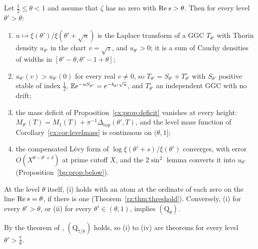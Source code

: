 \begin{corollary}\label{qrh:cor:thorin}
Let $\frac12\le\theta<1$ and assume that $\zeta$ has no zero with $\operatorname{Re} s>\theta$. Then for every level $\theta'>\theta$:
\begin{enumerate}
\item[(i)] $u\mapsto\xi(\theta')/\xi(\theta'+\sqrt u)$ is the Laplace transform of a GGC $T_{\theta'}$ with Thorin density $u_{\theta'}$ in the chart $v=\sqrt z$, and $u_{\theta'}>0$; it is a sum of Cauchy densities of widths in $[\theta'-\theta,\theta'-1+\theta]$;
\item[(ii)] $u_{\theta'}(v)>u_{\theta'}(0)$ for every real $v\ne0$, so $T_{\theta'}=S_{\theta'}+T^\circ_{\theta'}$ with $S_{\theta'}$ positive stable of index $\frac12$, $\mathbb{E} e^{-uS_{\theta'}}=e^{-b_{\theta'}\sqrt u}$, and $T^\circ_{\theta'}$ an independent GGC with no drift;
\item[(iii)] the mass deficit of Proposition~\ref{cx:prop:deficit} vanishes at every height: $M_{\theta'}(T)=M_1(T)+\pi^{-1}\Delta_{\mathrm{top}}(\theta',T)$, and the level mass function of Corollary~\ref{cx:cor:levelmass} is continuous on $(\theta,1]$;
\item[(iv)] the compensated L\'evy form of $\log\xi(\theta'+s)/\xi(\theta')$ converges, with error $O(X^{\theta-\theta'+\delta})$ at prime cutoff $X$, and the $2\sin^2$ lemma converts it into $u_{\theta'}$ (Proposition~\ref{bp:prop:below}).
\end{enumerate}
At the level $\theta$ itself, (i) holds with an atom at the ordinate of each zero on the line $\operatorname{Re} s=\theta$, if there is one (Theorem~\ref{rz:thm:threshold}). Conversely, (i) for every $\theta'>\theta$, or (ii) for every $\theta'\in(\theta,1)$, implies $(\mathrm Q_\theta)$.
\end{corollary}

By the theorem of \cite{OAI26a}, $(\mathrm Q_{7/8})$ holds, so (i) to (iv) are theorems for every level $\theta'>\frac78$.

